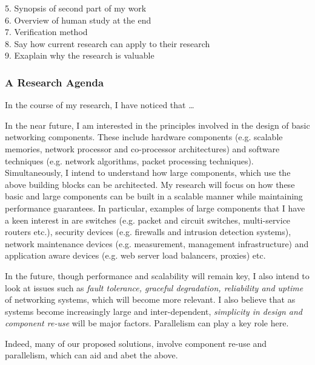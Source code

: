 \documentclass[a4paper, 10pt]{article}
\begin{document}
\begin{small}
5. Synopsis of second part of my work \\

6. Overview of human study at the end \\

7. Verification method \\

8. Say how current research can apply to their research \\

9. Exaplain why the research is valuable

\subsubsection*{A Research Agenda}

In the course of my research, I have noticed that \ldots

In the near future, I am interested in the 
principles involved in the design of basic networking 
components. These include
hardware components (e.g. scalable memories, 
network processor and co-processor architectures) and 
software techniques (e.g. network algorithms, packet processing 
techniques). 
  Simultaneously, I intend to understand how large components, which use
the above building blocks can be architected.
My research will focus on how these basic and large
components can be built in a scalable manner while maintaining 
performance guarantees. 
In particular, examples of large components that I have a keen
interest in are switches 
(e.g. packet and circuit switches, multi-service routers etc.), 
security devices (e.g. firewalls and intrusion detection 
systems), network maintenance devices (e.g. measurement,
management infrastructure) and application aware devices
(e.g. web server load balancers, proxies) etc. 

 In the future, though performance and scalability will remain key,
I also intend to look at issues such as {\it fault tolerance, graceful degradation,
reliability and uptime} of networking systems, which will become more relevant. 
I also believe that as systems become increasingly large and 
inter-dependent, {\it simplicity in design and component 
re-use} will be major factors.
Parallelism can play a key role here.

Indeed, many of our proposed solutions, involve component re-use and 
parallelism, which can aid and abet the above.


\end{small}
\end{document}

